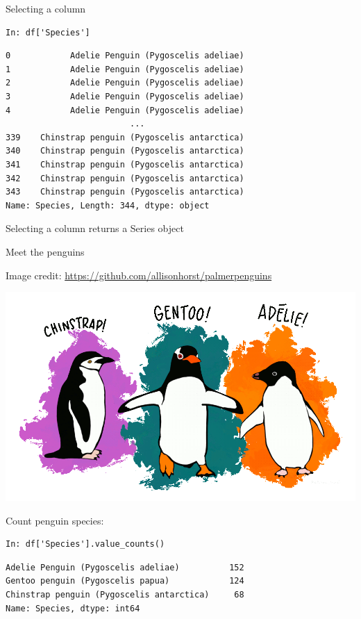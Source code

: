 \documentclass[aspectratio=169,usenames,dvipsnames]{beamer}
\begin{document}
\begin{frame}[fragile]{Selecting a column}
\begin{lstlisting}
In: df['Species']
\end{lstlisting}
\vspace{-1em}
\begin{lstlisting}[style=plain]
0            Adelie Penguin (Pygoscelis adeliae)
1            Adelie Penguin (Pygoscelis adeliae)
2            Adelie Penguin (Pygoscelis adeliae)
3            Adelie Penguin (Pygoscelis adeliae)
4            Adelie Penguin (Pygoscelis adeliae)
                         ...                    
339    Chinstrap penguin (Pygoscelis antarctica)
340    Chinstrap penguin (Pygoscelis antarctica)
341    Chinstrap penguin (Pygoscelis antarctica)
342    Chinstrap penguin (Pygoscelis antarctica)
343    Chinstrap penguin (Pygoscelis antarctica)
Name: Species, Length: 344, dtype: object
\end{lstlisting}

Selecting a column returns a Series object
\end{frame}


\begin{frame}[fragile]{Meet the penguins}
\begin{reference}
\footnotesize Image credit: \url{https://github.com/allisonhorst/palmerpenguins}
\end{reference}
\includegraphics[height=0.4\textheight]{fig/lter_penguins}

Count penguin species:
\begin{lstlisting}
In: df['Species'].value_counts()
\end{lstlisting}
\vspace{-1em}
\begin{lstlisting}[style=plain]
Adelie Penguin (Pygoscelis adeliae)          152
Gentoo penguin (Pygoscelis papua)            124
Chinstrap penguin (Pygoscelis antarctica)     68
Name: Species, dtype: int64
\end{lstlisting}

\end{frame}
\end{document}
